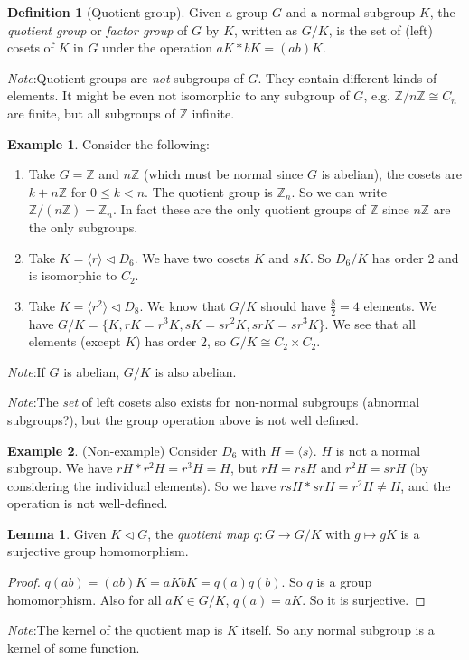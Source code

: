 \documentclass[a4paper]{article}
\theoremstyle{definition}
\newtheorem*{defi}{Definition}
\newtheorem*{eg}{Example}
\newtheorem*{lemma}{Lemma}
\newcommand{\note}{\noindent \emph{Note}:\;}
\newcommand{\Z}{\mathbb{Z}}
\newcommand{\bra}{\langle}
\newcommand{\ket}{\rangle}
\begin{document}
\begin{defi}[Quotient group]
  Given a group $G$ and a normal subgroup $K$, the \emph{quotient group} or \emph{factor group} of $G$ by $K$, written as $G/K$, is the set of (left) cosets of $K$ in $G$ under the operation $aK*bK = (ab)K$.
\end{defi}

\note Quotient groups are \emph{not} subgroups of $G$. They contain different kinds of elements. It might be even not isomorphic to any subgroup of $G$, e.g. $\Z/n\Z \cong C_n$ are finite, but all subgroups of $\Z$ infinite.

\begin{eg}
  Consider the following:
  \begin{enumerate}
  \item Take $G = \Z$ and $n\Z$ (which must be normal since $G$ is abelian), the cosets are $k + n\Z$ for $0 \leq k < n$. The quotient group is $\Z_n$. So we can write $\Z/(n\Z) = \Z_n$. In fact these are the only quotient groups of $\Z$ since $n\Z$ are the only subgroups.
  \item Take $K = \bra r\ket \lhd D_6$. We have two cosets $K$ and $sK$. So $D_6/K$ has order 2 and is isomorphic to $C_2$.
  \item Take $K = \bra r^2\ket \lhd D_8$. We know that $G/K$ should have $\frac{8}{2} = 4$ elements. We have $G/K = \{ K, rK = r^3 K, sK = sr^2K, srK = sr^3K\}$. We see that all elements (except $K$) has order $2$, so $G/K\cong C_2\times C_2$.
  \end{enumerate}
\end{eg}
\note If $G$ is abelian, $G/K$ is also abelian.

\note The \emph{set} of left cosets also exists for non-normal subgroups (abnormal subgroups?), but the group operation above is not well defined.

\begin{eg}
  (Non-example) Consider $D_6$ with $H = \bra s\ket$. $H$ is not a normal subgroup. We have $rH * r^2 H = r^3 H = H$, but $rH = rsH$ and $r^2H = srH$ (by considering the individual elements). So we have $rsH * srH = r^2 H\not= H$, and the operation is not well-defined.
\end{eg}

\begin{lemma}
  Given $K\lhd G$, the \emph{quotient map} $q: G\rightarrow G/K$ with $g\mapsto gK$ is a surjective group homomorphism.
\end{lemma}

\begin{proof}
  $q(ab) = (ab)K = aKbK = q(a)q(b)$. So $q$ is a group homomorphism. Also for all $aK \in G/K$, $q(a) = aK$. So it is surjective. 
\end{proof}
\note The kernel of the quotient map is $K$ itself. So any normal subgroup is a kernel of some function.
\end{document}
